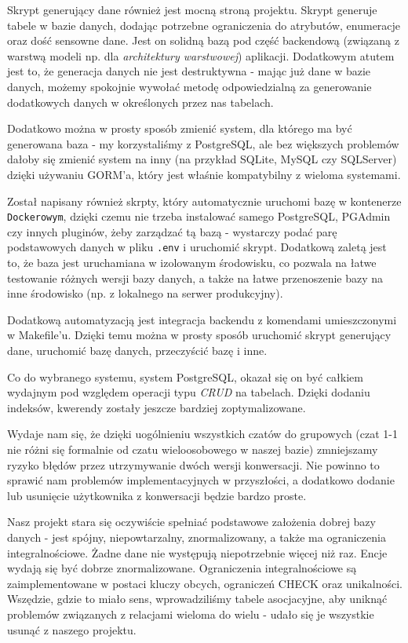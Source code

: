 \documentclass{article}
\begin{document}
Skrypt generujący dane również jest mocną stroną projektu. Skrypt generuje tabele w bazie danych, dodając potrzebne ograniczenia do atrybutów, enumeracje oraz dość sensowne dane. Jest on solidną bazą pod część backendową (związaną z warstwą modeli np. dla \textit{architektury warstwowej}) aplikacji. Dodatkowym atutem jest to, że generacja danych nie jest destruktywna - mając już dane w bazie danych, możemy spokojnie wywołać metodę odpowiedzialną za generowanie dodatkowych danych w określonych przez nas tabelach.

Dodatkowo można w prosty sposób zmienić system, dla którego ma być generowana baza - my korzystaliśmy z PostgreSQL, ale bez większych problemów dałoby się zmienić system na inny (na przykład SQLite, MySQL czy SQLServer) dzięki używaniu GORM'a, który jest właśnie kompatybilny z wieloma systemami.

Został napisany również skrpty, który automatycznie uruchomi bazę w kontenerze \texttt{Dockerowym}, dzięki czemu nie trzeba instalować samego PostgreSQL, PGAdmin czy innych pluginów, żeby zarządzać tą bazą - wystarczy podać parę podstawowych danych w pliku \texttt{.env} i uruchomić skrypt. Dodatkową zaletą jest to, że baza jest uruchamiana w izolowanym środowisku, co pozwala na łatwe testowanie różnych wersji bazy danych, a także na łatwe przenoszenie bazy na inne środowisko (np. z lokalnego na serwer produkcyjny).

Dodatkową automatyzacją jest integracja backendu z komendami umieszczonymi w Makefile'u. Dzięki temu można w prosty sposób uruchomić skrypt generujący dane, uruchomić bazę danych, przeczyścić bazę i inne.

Co do wybranego systemu, system PostgreSQL, okazał się on być całkiem wydajnym pod względem operacji typu \textit{CRUD} na tabelach. Dzięki dodaniu indeksów, kwerendy zostały jeszcze bardziej zoptymalizowane.

Wydaje nam się, że dzięki uogólnieniu wszystkich czatów do grupowych (czat 1-1 nie różni się formalnie od czatu wieloosobowego w naszej bazie) zmniejszamy ryzyko błędów przez utrzymywanie dwóch wersji konwersacji. Nie powinno to sprawić nam problemów implementacyjnych w przyszłości, a dodatkowo dodanie lub usunięcie użytkownika z konwersacji będzie bardzo proste.

Nasz projekt stara się oczywiście spełniać podstawowe założenia dobrej bazy danych - jest spójny, niepowtarzalny, znormalizowany, a także ma ograniczenia integralnościowe. Żadne dane nie występują niepotrzebnie więcej niż raz. Encje wydają się być dobrze znormalizowane. Ograniczenia integralnościowe są zaimplementowane w postaci kluczy obcych, ograniczeń CHECK oraz unikalności. Wszędzie, gdzie to miało sens, wprowadziliśmy tabele asocjacyjne, aby uniknąć problemów związanych z relacjami wieloma do wielu - udało się je wszystkie usunąć z naszego projektu.
\end{document}
